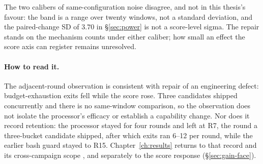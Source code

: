 The two calibers of same-configuration noise disagree, and not in this
thesis's favour: the band is a range over twenty windows, not a standard
deviation, and the paired-change SD of $3.70$ in \S\ref{sec:power} is not
a score-level sigma. The repair stands on the
mechanism counts under either caliber; how small an effect the score axis
can register remains unresolved.

\paragraph{How to read it.} The adjacent-round observation is consistent
with repair of an engineering defect: budget-exhaustion exits fell while the
score rose. Three candidates shipped concurrently and there is no
same-window comparison, so the observation does not isolate the processor's
efficacy or establish a capability change. Nor does it record retention:
the processor stayed for four rounds and left at R7, the round a
three-bucket candidate shipped, after which exits ran 6--12 per round,
while the earlier bash guard stayed to R15. Chapter~\ref{ch:results}
returns to that record and its cross-campaign scope , and separately
to the score response (\S\ref{sec:gain-face}).
